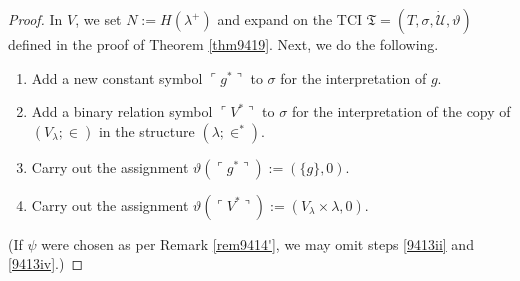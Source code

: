 \documentclass[12pt, twoside]{memoir}
\numberwithin{equation}{section}
\theoremstyle{definition}
\theoremstyle{remark}
\theoremstyle{definition}
\theoremstyle{definition}
\theoremstyle{definition}
\theoremstyle{remark}
\begin{document}
\begin{proof}
In $V$, we set $N := H(\lambda^+)$ and expand on the TCI $\mathfrak{T} = (T, \sigma, \dot{\mathcal{U}}, \vartheta)$ defined in the proof of Theorem \ref{thm9419}. Next, we do the following.
\begin{enumerate}[label=(\roman*)]
    \item Add a new constant symbol $\ulcorner g^* \urcorner$ to $\sigma$ for the interpretation of $g$.
    \item\label{9413ii} Add a binary relation symbol $\ulcorner V^* \urcorner$ to $\sigma$ for the interpretation of the copy of $(V_{\lambda}; \in)$ in the structure $(\lambda; \in^*)$.
    \item Carry out the assignment $\vartheta(\ulcorner g^* \urcorner) := (\{g\}, 0)$.
    \item\label{9413iv} Carry out the assignment $\vartheta(\ulcorner V^* \urcorner) := (V_{\lambda} \times \lambda, 0)$.
\end{enumerate}
(If $\psi$ were chosen as per Remark \ref{rem9414'}, we may omit steps \ref{9413ii} and \ref{9413iv}.)


\end{proof}
\end{document}
